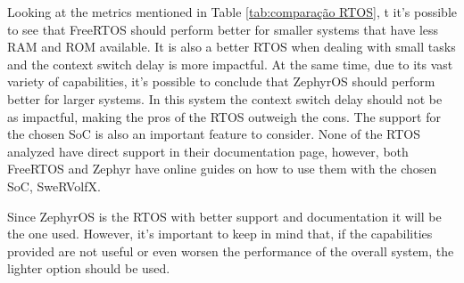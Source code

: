 Looking at the metrics mentioned in Table \ref{tab:comparação RTOS}, t it's possible to see that FreeRTOS should perform better for smaller systems that have less RAM and ROM available. It is also a better RTOS when dealing with small tasks and the context switch delay is more impactful. At the same time, due to its vast variety of capabilities, it's possible to conclude that ZephyrOS should perform better for larger systems. In this system the context switch delay should not be as impactful, making the pros of the RTOS outweigh the cons. The support for the chosen SoC is also an important feature to consider. None of the RTOS analyzed have direct support in their documentation page, however, both FreeRTOS and Zephyr have online guides on how to use them with the chosen SoC, SweRVolfX. 

Since ZephyrOS is the RTOS with better support and documentation it will be the one used. However, it's important to keep in mind that, if the capabilities provided are not useful or even worsen the performance of the overall system, the lighter option should be used.